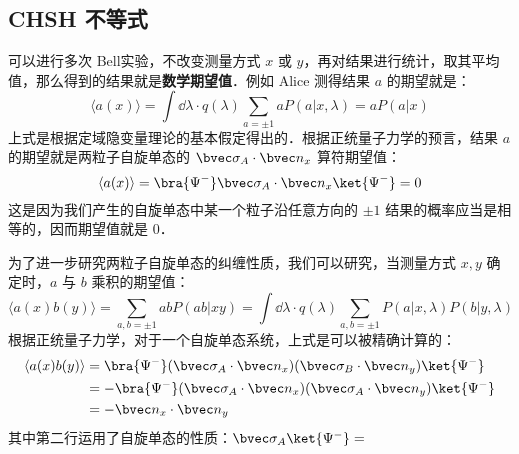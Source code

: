 \subsection{CHSH 不等式}
可以进行多次 Bell实验，不改变测量方式 $x$ 或 $y$，再对结果进行统计，取其平均值，那么得到的结果就是\textbf{数学期望值}．例如 Alice 测得结果 $a$ 的期望就是：
\begin{equation}
\langle a(x) \rangle =\int \dd \lambda \cdot q(\lambda) \sum_{a=\pm 1}a P(a|x,\lambda) = a P(a|x)
\end{equation}
上式是根据定域隐变量理论的基本假定得出的．根据正统量子力学的预言，结果 $a$ 的期望就是两粒子自旋单态的 $\bvec \sigma_A\cdot \bvec n_x$ 算符期望值：
\begin{equation}
\langle a(x)\rangle = \bra{\Psi^-} \bvec \sigma_A \cdot \bvec n_x \ket{\Psi^-} = 0
\end{equation}
这是因为我们产生的自旋单态中某一个粒子沿任意方向的 $\pm 1$ 结果的概率应当是相等的，因而期望值就是 $0$．

为了进一步研究两粒子自旋单态的纠缠性质，我们可以研究，当测量方式 $x,y$ 确定时，$a$ 与 $b$ 乘积的期望值：
\begin{equation}
\langle a(x)b(y)\rangle = \sum_{a,b=\pm 1} ab P(ab|xy)=\int \dd\lambda \cdot q(\lambda) \sum_{a,b=\pm 1}P(a|x,\lambda)P(b|y,\lambda)
\end{equation}
根据正统量子力学，对于一个自旋单态系统，上式是可以被精确计算的：
\begin{equation}
\begin{aligned}
\langle a(x)b(y)\rangle &= \bra{\Psi^-} (\bvec \sigma_A\cdot \bvec n_x)(\bvec \sigma_B\cdot \bvec n_y)\ket{\Psi^-}\\
&=-\bra{\Psi^-} (\bvec \sigma_A\cdot \bvec n_x)(\bvec \sigma_A\cdot \bvec n_y)\ket{\Psi^-}\\
&=-\bvec n_x\cdot \bvec n_y
\end{aligned}
\end{equation}
其中第二行运用了自旋单态的性质：$\bvec \sigma_A \ket{\Psi^-} = $